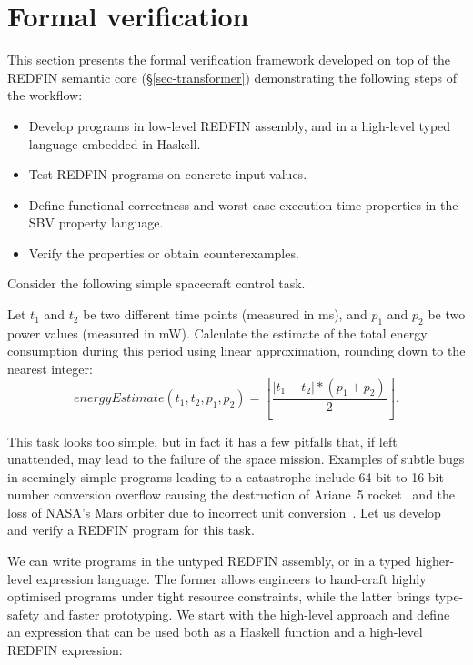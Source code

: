 \section{Formal verification\label{sec-verification}}
This section presents the formal verification framework developed on top of
the REDFIN semantic core (\S\ref{sec-transformer}) demonstrating the following
steps of the workflow:



\begin{itemize}
    \item Develop programs in low-level REDFIN assembly, and in a high-level
    typed language embedded in Haskell.
    \item Test REDFIN programs on concrete input values.
    \item Define functional correctness and worst case execution time properties
    in the SBV property language.
    \item Verify the properties or obtain counterexamples.
\end{itemize}

\noindent
Consider the following simple spacecraft control task.

\begin{tcolorbox}
Let $t_1$ and $t_2$ be two different time points (measured in ms),
and $p_1$ and $p_2$ be two power values (measured in mW).
Calculate the estimate of the total energy consumption during this period
using linear approximation, rounding down to the nearest integer:
\[
\textit{energyEstimate}(t_1, t_2, p_1, p_2) = \left\lfloor \frac{|t_1 - t_2| * (p_1 + p_2)}{2} \right\rfloor.
\]
\end{tcolorbox}

\noindent
This task looks too simple, but in fact it has a few pitfalls that,
if left unattended, may lead to the failure of the space mission. Examples
of subtle bugs in seemingly simple programs leading to a catastrophe include 64-bit
to 16-bit number conversion overflow causing the destruction of Ariane~5
rocket~\cite{bug-rocket} and the loss of NASA's Mars orbiter due to incorrect
unit conversion~\cite{NASA:1999:Mars}. Let us develop and verify
a REDFIN program for this task.

We can write programs in the untyped REDFIN assembly, or in a typed higher-level
expression language. The former allows engineers to hand-craft highly optimised
programs under tight resource constraints, while the latter brings type-safety
and faster prototyping. We start with the high-level approach and define an
expression that can be used both as a Haskell function and a high-level REDFIN
expression:

